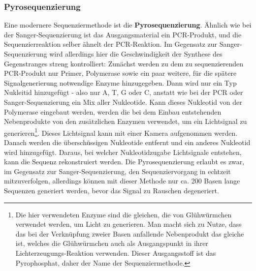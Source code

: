 \subsubsection{Pyrosequenzierung}

Eine modernere Sequenziermethode ist die \textbf{Pyrosequenzierung}. Ähnlich wie bei der Sanger-Sequenzierung ist das Ausgangsmaterial ein PCR-Produkt, und die Sequenzierreaktion selber ähnelt der PCR-Reaktion. Im Gegensatz zur Sanger-Sequenzierung wird allerdings hier die Geschwindigkeit der Synthese des Gegenstranges streng kontrolliert: Zunächst werden zu dem zu sequenzierenden PCR-Produkt nur Primer, Polymerase sowie ein paar weitere, für die spätere Signalgenerierung notwendige Enzyme hinzugegeben. Dann wird nur ein Typ Nukleitid hinzugefügt - also nur A, T, G oder C, anstatt wie bei der PCR oder Sanger-Sequenzierung ein Mix aller Nukleotide. Kann dieses Nukleotid von der Polymerase eingebaut werden, werden die bei dem Einbau entstehenden Nebenprodukte von den zusätzlichen Enzymen verwendet, um ein Lichtsignal zu generieren\footnote{Die hier verwendeten Enzyme sind die gleichen, die von Glühwürmchen verwendet werden, um Licht zu generieren. Man macht sich zu Nutze, dass das bei der Verknüpfung zweier Basen anfallende Nebenprodukt das gleiche ist, welches die Glühwürmchen auch als Ausgangspunkt in ihrer Lichterzeugungs-Reaktion verwenden. Dieser Ausgangsstoff ist das Pyrophosphat, daher der Name der Sequenziermethode.}. Dieses Lichtsignal kann mit einer Kamera aufgenommen werden. Danach werden die überschüssigen Nukleotide entfernt und ein anderes Nukleotid wird hinzugefügt. Daraus, bei welcher Nukleotidzugabe Lichtsignale entstehen, kann die Sequenz rekonstruiert werden. Die Pyrosequenzierung erlaubt es zwar, im Gegensatz zur Sanger-Sequenzierung, den Sequenziervorgang in echtzeit mitzuverfolgen, allerdings können mit dieser Methode nur ca. 200 Basen lange Sequenzen generiert werden, bevor das Signal zu Rauschen degeneriert. 

